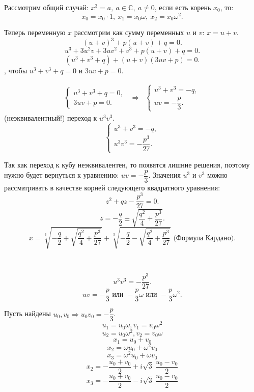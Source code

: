 \documentclass[12pt]{article}
\begin{document}
Рассмотрим общий случай: $x^3 = a,~a \in \mathbb{C},~a \neq 0$, если есть корень $x_0$, то: $$x_0 = x_0\cdot1,~x_1 = x_0 \omega,~x_2 = x_0 \omega^2.$$

Теперь переменную $x$ рассмотрим как сумму переменных $u$ и $v$: $x = u + v$.
$$(u + v)^3 + p(u + v) + q = 0.$$
$$u^3 + 3u^2v + 3uv^2 + v^3 + p(u + v) + q = 0.$$
$$(u^3 + v^3 + q) + (u + v)(3uv + p) = 0.$$
, чтобы $u^3 + v^3 + q = 0$ и $3uv + p = 0$.

\begin{align*}
\begin{cases}
   u^3 + v^3 + q = 0, \\
   3uv + p = 0.
\end{cases}
&
\Rightarrow
&
 \begin{cases}
   u^3 + v^3 = -q, 
   \\
   uv = -\dfrac{p}{3}.
 \end{cases}
\end{align*}
 (неэквивалентный!) переход к $u^3v^3$.
\begin{equation*}
 \begin{cases}
   u^3 + v^3 = -q, 
   \\
   u^3v^3 = -\dfrac{p^3}{27}.
 \end{cases}
\end{equation*}

Так как переход к кубу неэквивалентен, то появятся лишние решения, поэтому нужно будет вернуться к уравнению: $uv = -\dfrac{p}{3}.$ \newline
\indent
Значения $u^3$ и $v^3$ можно рассматривать в качестве корней следующего квадратного уравнения:
$$z^2 + qz -\dfrac{p^3}{27} = 0.$$
$$z = -\frac{q}{2} \pm \sqrt{\frac{q^2}{4} + \frac{p^3}{27}}.$$
$$x = \sqrt[3]{-\frac{q}{2} + \sqrt{\frac{q^2}{4} + \frac{p^3}{27}}} + \sqrt[3]{-\frac{q}{2} - \sqrt{\frac{q^2}{4} + \frac{p^3}{27}}} \textbf{  (Формула Кардано)}.$$

~\

$$u^3v^3 = -\dfrac{p^3}{27}.$$
$$uv = -\dfrac{p}{3} \text{ или }  -\dfrac{p}{3}\omega \text{ или } -\dfrac{p}{3}\omega^2.$$

Пусть найдены $u_0, v_0 \Rightarrow u_0v_0 = -\dfrac{p}{3}$.
$$u_1 = u_0\omega, v_1 = v_0\omega^2$$
$$u_2 = u_0\omega^2, v_2 = v_0\omega$$
$$x_1 = u_0 + v_0$$
$$x_2 = \omega u_0 + \omega^2 v_0$$
$$x_3 = \omega^2 u_0 + \omega v_0$$
$$x_2 = -\frac{u_0 + v_0}{2} + i\sqrt{3} \ \frac{u_0 - v_0}{2}$$
$$x_3 = -\frac{u_0 + v_0}{2} - i\sqrt{3} \ \frac{u_0 - v_0}{2}$$
\end{document}

